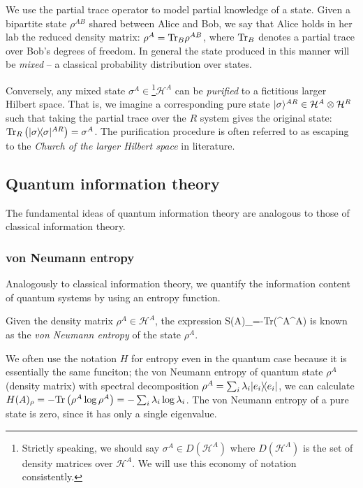 \documentclass[aps,11pt,twoside,letterpaper]{article}
\def\Tr{\textup{Tr}}
\def\cH{\mathcal{H}}
\begin{document}
			We use the partial trace operator to model partial knowledge of a state.
			Given a bipartite state $\rho^{AB}$ shared between Alice and Bob, we say that Alice holds in her lab
			the reduced density matrix: $\rho^A = \Tr_B\rho^{AB}$, where $\Tr_B$ denotes a partial trace over 
			Bob's degrees of freedom.
			In general the state produced in this manner will be \emph{mixed} -- a classical probability distribution
			over states.
			
			Conversely, any mixed state $\sigma^A \in$\footnote{Strictly speaking, we should say 
			$\sigma^A \in D(\cH^A)$ where $D(\cH^A)$ is the set of density matrices over $\cH^A$. 
			We will use this economy of notation consistently.}$\cH^A$
			 can be \emph{purified} to a fictitious 
			larger Hilbert space. 
			That is, we imagine a corresponding pure state $\ket{\sigma}^{AR} \in \cH^A \otimes \cH^R$
			such that taking the partial trace over the $R$ system gives the original state: 
			$\Tr_R\left(\proj{\sigma}^{AR}\right)=\sigma^A$. 
			The purification procedure is often referred to as escaping to the \emph{Church of the larger
			Hilbert space} in literature.

		
	\subsection{Quantum information theory}
		The fundamental ideas of quantum information theory are analogous to those of classical information theory. 
		\subsubsection{von Neumann entropy}
		
			Analogously to classical information theory, we quantify the information content of quantum systems 
			by using an entropy function.
			
			\begin{definition} 
				Given the density matrix $\rho^A \in \cH^A$, the expression
				\be
					S(A)_\rho=-\Tr\left(\rho^A\log\rho^A\right)
				\ee
				is known as the \emph{von Neumann entropy} of the state $\rho^A$. 
			\end{definition}
		
            We often use the notation $H$ for entropy even in the quantum case because it is essentially
            the same funciton; the von Neumann entropy of quantum state $\rho^A$ (density matrix) 
            with spectral decomposition $\rho^A = \sum_i \lambda_i | e_i \rangle\!\langle e_i |$, we 
			can calculate $H(A)_\rho=-\Tr\left(\rho^A\log\rho^A\right) = - \sum_i \lambda_i \log \lambda_i$.
			The von Neumann entropy of a pure state is zero, since it has only a single eigenvalue.
\end{document}
